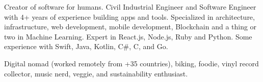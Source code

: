 

\begin{cvparagraph}

Creator of software for humans. Civil Industrial Engineer and Software Engineer with 4+ years of experience building apps and tools. Specialized in architecture, infrastructure, web development, mobile development, Blockchain and a thing or two in Machine Learning. Expert in React.js, Node.js, Ruby and Python. Some experience with Swift, Java, Kotlin, C\#, C, and Go.

Digital nomad (worked remotely from +35 countries), biking, foodie, vinyl record collector, music nerd, veggie, and sustainability enthusiast.
\end{cvparagraph}
